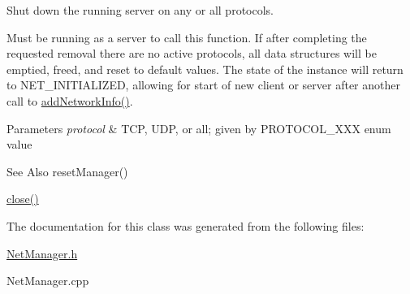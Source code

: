 Shut down the running server on any or all protocols. 

Must be running as a server to call this function. If after completing the requested removal there are no active protocols, all data structures will be emptied, freed, and reset to default values. The state of the instance will return to N\-E\-T\-\_\-\-I\-N\-I\-T\-I\-A\-L\-I\-Z\-E\-D, allowing for start of new client or server after another call to \hyperlink{classNetManager_a8ec0340fa0eeffc5f4344589069e6058}{add\-Network\-Info()}. 
\begin{DoxyParams}{Parameters}
{\em protocol} & T\-C\-P, U\-D\-P, or all; given by P\-R\-O\-T\-O\-C\-O\-L\-\_\-\-X\-X\-X enum value \\
\hline
\end{DoxyParams}
\begin{DoxySeeAlso}{See Also}
reset\-Manager() 

\hyperlink{classNetManager_afcf943b4ab1e94ba479f4e3f0cd9da2e}{close()} 
\end{DoxySeeAlso}


The documentation for this class was generated from the following files\-:\begin{DoxyCompactItemize}
\item 
\hyperlink{NetManager_8h}{Net\-Manager.\-h}\item 
Net\-Manager.\-cpp\end{DoxyCompactItemize}
